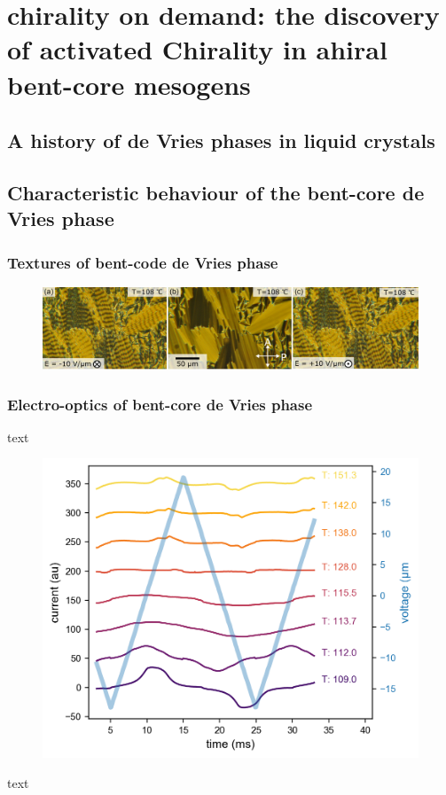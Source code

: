 \documentclass[aagreenthesis]{subfiles}
\begin{document}
\chapter{chirality on demand: the discovery of activated Chirality in ahiral
bent-core mesogens}
\section{A history of de Vries phases in liquid crystals}
\section{Characteristic behaviour of the bent-core de Vries phase}
\subsection{Textures of bent-code de Vries phase}

\begin{figure}[h!]
    \centering
    \includegraphics[width=.8\textwidth]{figs/pal30/textureSM2/sm1Textures100.png}
    \caption{\label{}}
\end{figure}


\subsection{Electro-optics of bent-core de Vries phase}
text
\begin{figure}[h!]
    \centering
    \includegraphics[width=.8\textwidth]{figs/pal30/prc/spacedSm1PRC.png}
    \caption{\label{}}
\end{figure}
text
\end{document}
